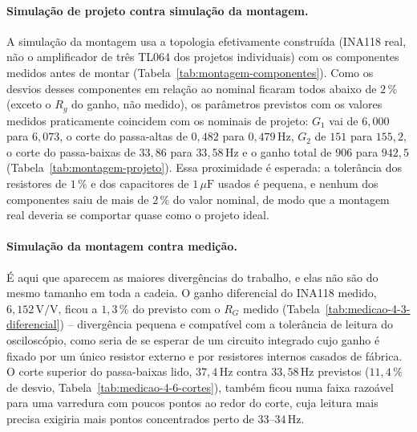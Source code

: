\documentclass[11pt,a4paper]{article}
\begin{document}
\paragraph{Simulação de projeto contra simulação da montagem.} A simulação da montagem usa a topologia efetivamente construída (INA118 real, não o amplificador de três TL064 dos projetos individuais) com os componentes medidos antes de montar (Tabela~\ref{tab:montagem-componentes}). Como os desvios desses componentes em relação ao nominal ficaram todos abaixo de \(2\,\%\) (exceto o \(R_g\) do ganho, não medido), os parâmetros previstos com os valores medidos praticamente coincidem com os nominais de projeto: \(G_1\) vai de \(6{,}000\) para \(6{,}073\), o corte do passa-altas de \(0{,}482\) para \(0{,}479\,\text{Hz}\), \(G_2\) de \(151\) para \(155{,}2\), o corte do passa-baixas de \(33{,}86\) para \(33{,}58\,\text{Hz}\) e o ganho total de \(906\) para \(942{,}5\) (Tabela~\ref{tab:montagem-projeto}). Essa proximidade é esperada: a tolerância dos resistores de \(1\,\%\) e dos capacitores de \(1\,\mu\text{F}\) usados é pequena, e nenhum dos componentes saiu de mais de \(2\,\%\) do valor nominal, de modo que a montagem real deveria se comportar quase como o projeto ideal.

\paragraph{Simulação da montagem contra medição.} É aqui que aparecem as maiores divergências do trabalho, e elas não são do mesmo tamanho em toda a cadeia. O ganho diferencial do INA118 medido, \(6{,}152\,\text{V/V}\), ficou a \(1{,}3\,\%\) do previsto com o \(R_G\) medido (Tabela~\ref{tab:medicao-4-3-diferencial}) -- divergência pequena e compatível com a tolerância de leitura do osciloscópio, como seria de se esperar de um circuito integrado cujo ganho é fixado por um único resistor externo e por resistores internos casados de fábrica. O corte superior do passa-baixas lido, \(37{,}4\,\text{Hz}\) contra \(33{,}58\,\text{Hz}\) previstos (\(11{,}4\,\%\) de desvio, Tabela~\ref{tab:medicao-4-6-cortes}), também ficou numa faixa razoável para uma varredura com poucos pontos ao redor do corte, cuja leitura mais precisa exigiria mais pontos concentrados perto de \(33\)--\(34\,\text{Hz}\).
\end{document}
